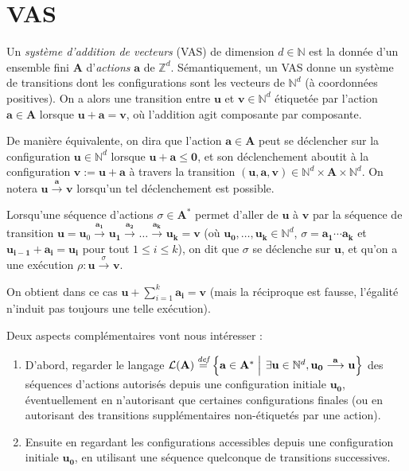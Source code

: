 \documentclass[a4paper,final]{article}
\let\leq\leqslant
\newcommand{\set}[2]{\left\{#1\mathrel{\left|\vphantom{#1}\vphantom{#2}\right.}#2\right\}}
\newcommand{\defeq}{\ensuremath{\stackrel{\textit{def}}{=}}}
\newcommand{\N}{\ensuremath{\mathbb{N}}}
\newcommand{\Z}{\ensuremath{\mathbb{Z}}}
\newcommand{\lang}{\ensuremath{\mathcal{L}}}
\newcommand{\trans}[2]{\ensuremath{\stackrel{#1}{\longrightarrow}_{#2}}}
\newcommand{\vect}[1]{\ensuremath{\mathbf{#1}}}
\newcommand{\action}[1]{\ensuremath{\mathbf{#1}}}
\newcommand{\ensaction}{\ensuremath{\mathbf{A}}}
\begin{document}

\section{VAS}

Un \emph{système d'addition de vecteurs} (VAS) de dimension $d\in\N$ est la donnée d'un ensemble fini $\ensaction$ d'\emph{actions} $\action{a}$ de $\Z^d$.
Sémantiquement, un VAS donne un système de transitions dont les configurations sont les vecteurs de $\N^d$ (à coordonnées positives).
On a alors une transition entre $\vect{u}$ et $\vect{v}\in\N^d$ étiquetée par l'action $\action{a}\in\ensaction$ lorsque $\vect{u} + \action{a} = \vect{v}$, où l'addition agit composante par composante.

De manière équivalente, on dira que l'action $\action{a}\in\ensaction$ peut se déclencher sur la configuration $\vect{u}\in \N^d$ lorsque $\vect{u} + \action{a} \leq \vect{0}$,
et son déclenchement aboutit à la configuration $\vect{v} := \vect{u} + \action{a}$ à travers la transition $(\vect{u},\action{a},\vect{v})\in \N^d\times \ensaction\times \N^d$.
On notera $\vect{u}\trans{\action{a}}{} \vect{v}$ lorsqu'un tel déclenchement est possible.

Lorsqu'une séquence d'actions $\sigma\in\ensaction^\ast$ permet d'aller de $\vect{u}$ à $\vect{v}$ par la séquence de transition $\vect{u}= \vect{u}_0\trans{\action{a_1}}{} \vect{u_1}\trans{\action{a_2}}{} \dots\trans{\action{a_k}}{} \vect{u_k}=\vect{v}$
(où $\vect{u_0},\dots,\vect{u_k} \in\N^d$, $\sigma=\action{a_1}\cdots \action{a_k}$ et $\vect{u_{i-1}}+\action{a_i}= \vect{u_i}$ pour tout $1\leq i\leq k$),
on dit que $\sigma$ se déclenche sur $\vect{u}$, et qu'on a une exécution $\rho :\vect{u}\trans{\sigma}{} \vect{v}$.

On obtient dans ce cas $\vect{u}+\sum^k_{i=1} \action{a_i} = \vect{v}$ (mais la réciproque est fausse, l'égalité n'induit pas toujours une telle exécution).

Deux aspects complémentaires vont nous intéresser :
\begin{enumerate}
    \item D'abord, regarder le langage $\lang(\ensaction)\defeq \set{\action{a}\in \ensaction^\ast} {\exists \vect{u}\in\N^d, \vect{u_0}\trans{\action{a}}{}\vect{u}}$ des séquences d'actions autorisés depuis une configuration initiale $\vect{u_0}$, éventuellement en n'autorisant que certaines configurations finales (ou en autorisant des transitions supplémentaires non-étiquetés par une action).
    \item Ensuite en regardant les configurations accessibles depuis une configuration initiale $\vect{u_0}$, en utilisant une séquence quelconque de transitions successives.
\end{enumerate}
\end{document}
